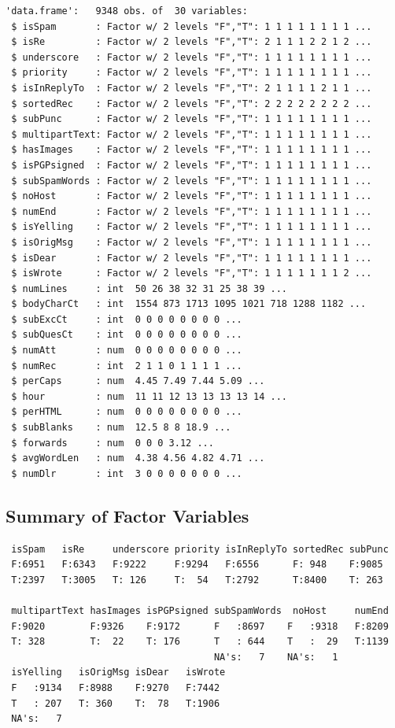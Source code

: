 \documentclass[
]{article}
\begin{document}
\begin{verbatim}
'data.frame':   9348 obs. of  30 variables:
 $ isSpam       : Factor w/ 2 levels "F","T": 1 1 1 1 1 1 1 1 ...
 $ isRe         : Factor w/ 2 levels "F","T": 2 1 1 1 2 2 1 2 ...
 $ underscore   : Factor w/ 2 levels "F","T": 1 1 1 1 1 1 1 1 ...
 $ priority     : Factor w/ 2 levels "F","T": 1 1 1 1 1 1 1 1 ...
 $ isInReplyTo  : Factor w/ 2 levels "F","T": 2 1 1 1 1 2 1 1 ...
 $ sortedRec    : Factor w/ 2 levels "F","T": 2 2 2 2 2 2 2 2 ...
 $ subPunc      : Factor w/ 2 levels "F","T": 1 1 1 1 1 1 1 1 ...
 $ multipartText: Factor w/ 2 levels "F","T": 1 1 1 1 1 1 1 1 ...
 $ hasImages    : Factor w/ 2 levels "F","T": 1 1 1 1 1 1 1 1 ...
 $ isPGPsigned  : Factor w/ 2 levels "F","T": 1 1 1 1 1 1 1 1 ...
 $ subSpamWords : Factor w/ 2 levels "F","T": 1 1 1 1 1 1 1 1 ...
 $ noHost       : Factor w/ 2 levels "F","T": 1 1 1 1 1 1 1 1 ...
 $ numEnd       : Factor w/ 2 levels "F","T": 1 1 1 1 1 1 1 1 ...
 $ isYelling    : Factor w/ 2 levels "F","T": 1 1 1 1 1 1 1 1 ...
 $ isOrigMsg    : Factor w/ 2 levels "F","T": 1 1 1 1 1 1 1 1 ...
 $ isDear       : Factor w/ 2 levels "F","T": 1 1 1 1 1 1 1 1 ...
 $ isWrote      : Factor w/ 2 levels "F","T": 1 1 1 1 1 1 1 2 ...
 $ numLines     : int  50 26 38 32 31 25 38 39 ...
 $ bodyCharCt   : int  1554 873 1713 1095 1021 718 1288 1182 ...
 $ subExcCt     : int  0 0 0 0 0 0 0 0 ...
 $ subQuesCt    : int  0 0 0 0 0 0 0 0 ...
 $ numAtt       : num  0 0 0 0 0 0 0 0 ...
 $ numRec       : int  2 1 1 0 1 1 1 1 ...
 $ perCaps      : num  4.45 7.49 7.44 5.09 ...
 $ hour         : num  11 11 12 13 13 13 13 14 ...
 $ perHTML      : num  0 0 0 0 0 0 0 0 ...
 $ subBlanks    : num  12.5 8 8 18.9 ...
 $ forwards     : num  0 0 0 3.12 ...
 $ avgWordLen   : num  4.38 4.56 4.82 4.71 ...
 $ numDlr       : int  3 0 0 0 0 0 0 0 ...
\end{verbatim}

\hypertarget{summary-of-factor-variables}{%
\subsection{Summary of Factor
Variables}\label{summary-of-factor-variables}}

\begin{verbatim}
 isSpam   isRe     underscore priority isInReplyTo sortedRec subPunc 
 F:6951   F:6343   F:9222     F:9294   F:6556      F: 948    F:9085  
 T:2397   T:3005   T: 126     T:  54   T:2792      T:8400    T: 263  
                                                                     
 multipartText hasImages isPGPsigned subSpamWords  noHost     numEnd  
 F:9020        F:9326    F:9172      F   :8697    F   :9318   F:8209  
 T: 328        T:  22    T: 176      T   : 644    T   :  29   T:1139  
                                     NA's:   7    NA's:   1           
 isYelling   isOrigMsg isDear   isWrote 
 F   :9134   F:8988    F:9270   F:7442  
 T   : 207   T: 360    T:  78   T:1906  
 NA's:   7                              
\end{verbatim}
\end{document}
